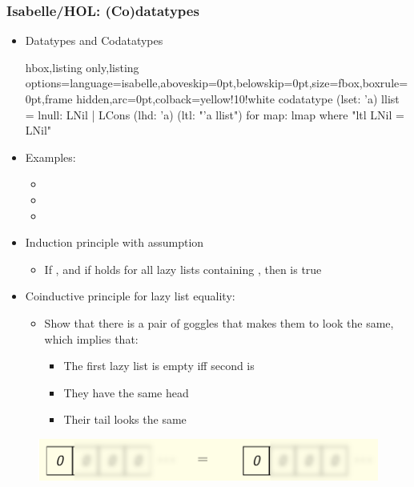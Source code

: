 \documentclass[aspectratio=169,10pt]{beamer}
\begin{document}
\begin{frame}
  \frametitle{Isabelle/HOL: (Co)datatypes}
  \begin{itemize}
    \item Datatypes and Codatatypes
\vspace*{-1ex}
          \begin{tcblisting}{hbox,listing only,listing options={language=isabelle,aboveskip=0pt,belowskip=0pt},size=fbox,boxrule=0pt,frame hidden,arc=0pt,colback=yellow!10!white}
codatatype (lset: 'a) llist = lnull: LNil | LCons (lhd: 'a) (ltl: "'a llist")
  for map: lmap where "ltl LNil = LNil"
          \end{tcblisting}
\vspace*{-1ex}
    \item Examples:
          \begin{itemize}
            \item {}
            \item {}
            \item {}
          \end{itemize}
\vspace*{-1ex}
    \item Induction principle with  assumption
          \begin{itemize}
            \item If , and if  holds for all lazy lists containing , then  is true
          \end{itemize}
    \item Coinductive principle for lazy list equality:
          \begin{itemize}
            \item Show that there is a pair of goggles that makes them to look the same, which implies that:
                  \begin{itemize}
                    \item The first lazy list is empty iff second is
                    \item They have the same head
                    \item Their tail looks the same
                  \end{itemize}
          \end{itemize}
  \end{itemize}
\vspace*{-1ex}
\begin{overlayarea}{\textwidth}{.45\textheight}
  \begin{figure}
    \centering
    \includegraphics[scale=0.3]{equality_2.png}
  \end{figure}
\end{overlayarea}
\end{frame}
\end{document}
